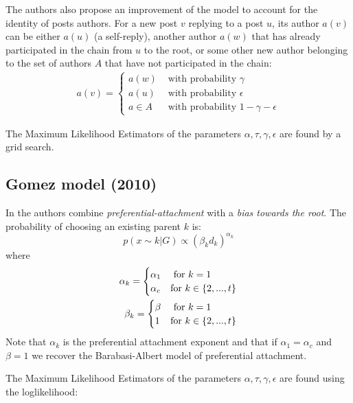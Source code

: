 \documentclass[smallextended]{svjour3}          %
\begin{document}
The authors also propose an improvement of the model to account for the identity of posts authors. For a new post $v$ replying to a post $u$, its author $a(v)$ can be either $a(u)$ (a self-reply), another author $a(w)$ that has already participated in the chain from $u$ to the root, or some other new author belonging to the set of authors $A$ that have not participated in the chain:
\begin{align}
a(v) = 
\begin{cases}
a(w) & \text{ with probability } \gamma\\
a(u) & \text{ with probability } \epsilon\\
a \in A & \text{ with probability } 1 -\gamma - \epsilon 
\end{cases}
\end{align} 

The Maximum Likelihood Estimators of the parameters $\alpha, \tau, \gamma, \epsilon$ are found by a grid search.

\subsection{Gomez model (2010)}
In \cite{Gomez2010} the authors combine \textit{preferential-attachment} with a \textit{bias towards the root}. The probability of choosing an existing parent $k$ is:
\[
p(x \sim k | G) 
\propto 
(\beta_k d_{k})^{\alpha_k}
\]
where 
\begin{align}
\alpha_k = 
\begin{cases}
	\alpha_1 & \text{ for } k=1 \\	
	\alpha_c & \text{for } k \in \{2,...,t\}
\end{cases}\notag\\
\beta_k = 
\begin{cases}
\beta & \text{ for } k=1 \\	
1 & \text{for } k \in \{2,...,t\}
\end{cases}
\end{align}
Note that $\alpha_k$ is the preferential attachment exponent and that if $\alpha_1=\alpha_c$ and $\beta=1$ we recover the Barabasi-Albert model of preferential attachment.

The Maximum Likelihood Estimators of the parameters $\alpha, \tau, \gamma, \epsilon$ are found using the loglikelihood:
\end{document}

